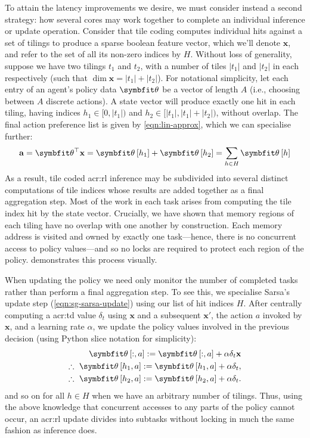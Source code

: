 To attain the latency improvements we desire, we must consider instead a second strategy: how several cores may work together to complete an individual inference or update operation.
Consider that tile coding computes individual hits against a set of tilings to produce a sparse boolean feature vector, which we'll denote $\mathbf{x}$, and refer to the set of all its non-zero indices by $H$.
Without loss of generality, suppose we have two tilings $t_1$ and $t_2$, with a number of tiles $|t_1|$ and $|t_2|$ in each respectively (such that $\dim{\mathbf{x}}=|t_1|+|t_2|$).
For notational simplicity, let each entry of an agent's policy data $\wvec{}$ be a vector of length $A$ (i.e., choosing between $A$ discrete actions).
A state vector will produce exactly one hit in each tiling, having indices $h_1\in[0,|t_1|)$ and $h_2\in[|t_1|,|t_1|+|t_2|)$, without overlap.
The final action preference list is given by \cref{eqn:lin-approx}, which we can specialise further:
$$
\mathbf{a} = \wvec{}^{\top} \mathbf{x} = \wvec{}\left[h_1\right] + \wvec{}\left[h_2\right] = \sum_{h\in{}H}\wvec{}\left[h\right]
$$
As a result, tile coded \gls{acr:rl} inference may be subdivided into several distinct computations of tile indices whose results are added together as a final aggregation step.
Most of the work in each task arises from computing the tile index hit by the state vector.
Crucially, we have shown that memory regions of each tiling have no overlap with one another by construction.
Each memory address is visited and owned by exactly one task---hence, there is no concurrent access to policy values---and so no locks are required to protect each region of the policy.
 demonstrates this process visually.

When updating the policy we need only monitor the number of completed tasks rather than perform a final aggregation step.
To see this, we specialise Sarsa's update step (\cref{eqn:sg-sarsa-update}) using our list of hit indices $H$.
After centrally computing a \gls{acr:td} value $\delta_t$ using $\mathbf{x}$ and a subsequent $\mathbf{x}'$, the action $a$ invoked by $\mathbf{x}$, and a learning rate $\alpha$, we update the policy values involved in the previous decision (using Python slice notation for simplicity):
\begin{align*}
\wvec{}\left[:,a\right] := \wvec{}\left[:,a\right] + \alpha\delta_t \mathbf{x}\\
\therefore~\wvec{}\left[h_1,a\right] := \wvec{}\left[h_1,a\right] + \alpha\delta_t,\\
\therefore~\wvec{}\left[h_2,a\right] := \wvec{}\left[h_2,a\right] + \alpha\delta_t.
\end{align*}
and so on for all $h \in H$ when we have an arbitrary number of tilings.
Thus, using the above knowledge that concurrent accesses to any parts of the policy cannot occur, an \gls{acr:rl} update divides into subtasks without locking in much the same fashion as inference does.


